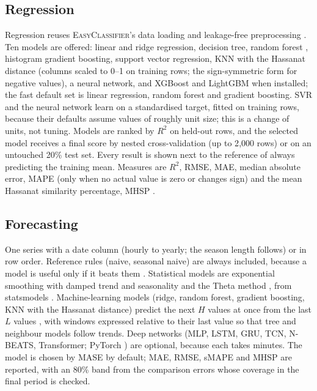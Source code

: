 \documentclass[11pt,a4paper]{article}
\newcommand{\EC}{\textsc{EasyClassifier}}
\begin{document}
\subsection{Regression}
Regression reuses \EC's data loading and leakage-free preprocessing \citep{pedregosa2011sklearn}. Ten models are offered: linear and ridge regression, decision tree, random forest \citep{breiman2001rf}, histogram gradient boosting, support vector regression, KNN with the Hassanat distance \citep{hassanat2014arxiv,hassanat2014distance} (columns scaled to 0--1 on training rows; the sign-symmetric form \citep{hassanat2014distance2} for negative values), a neural network, and XGBoost and LightGBM when installed; the fast default set is linear regression, random forest and gradient boosting. SVR and the neural network learn on a standardised target, fitted on training rows, because their defaults assume values of roughly unit size; this is a change of units, not tuning. Models are ranked by $R^2$ on held-out rows, and the selected model receives a final score by nested cross-validation (up to 2{,}000 rows) or on an untouched 20\% test set. Every result is shown next to the reference of always predicting the training mean. Measures are $R^2$, RMSE, MAE, median absolute error, MAPE (only when no actual value is zero or changes sign) and the mean Hassanat similarity percentage, MHSP \citep{hassanat2024mhsp}.

\subsection{Forecasting}
One series with a date column (hourly to yearly; the season length follows) or in row order. Reference rules (naive, seasonal naive) are always included, because a model is useful only if it beats them \citep{hyndman2021fpp3}. Statistical models are exponential smoothing with damped trend and seasonality \citep{hyndman2002ets} and the Theta method \citep{assimakopoulos2000theta}, from statsmodels \citep{seabold2010statsmodels}. Machine-learning models (ridge, random forest, gradient boosting, KNN with the Hassanat distance) predict the next $H$ values at once from the last $L$ values \citep{bontempi2013strategies}, with windows expressed relative to their last value so that tree and neighbour models follow trends. Deep networks (MLP, LSTM, GRU, TCN, N-BEATS, Transformer; PyTorch \citep{paszke2019pytorch}) are optional, because each takes minutes. The model is chosen by MASE \citep{hyndman2006mase} by default; MAE, RMSE, sMAPE and MHSP are reported, with an 80\% band from the comparison errors whose coverage in the final period is checked.
\end{document}
